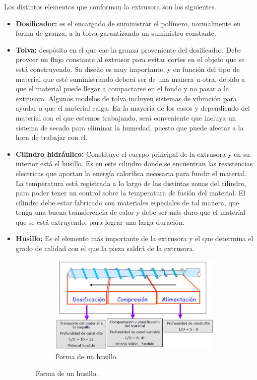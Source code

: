 Los distintos elementos que conforman la extrusora son los siguientes.
\begin{itemize}
    \item \textbf{Dosificador:} es el encargado de suministrar el polímero, normalmente en forma de granza, a la tolva garantizando un suministro constante.
    \item \textbf{Tolva:} despósito en el que cae la granza proveniente del dosificador. Debe proveer un flujo constante al extrusor para evitar cortes en el objeto que se está construyendo. Su diseño es muy importante, y en función del tipo de material que esté suministrando deberá ser de una manera u otra, debido a que el material puede llegar a compactarse en el fondo y no pasar a la extrusora. Algunos modelos de tolva incluyen sistemas de vibración para ayudar a que el material caiga. En la mayoría de los casos y dependiendo del material con el que estemos trabajando, será conveniente que incluya un sistema de secado para eliminar la humedad, puesto que puede afectar a la hora de trabajar con el.
    \item \textbf{Cilindro hidráulico:} Constituye el cuerpo principal de la extrusora y en su interior está el husillo. Es en este cilindro donde se encuentran las resistencias electricas que aportan la energía calorífica necesaria para fundir el material. La temperatura está registrada a lo largo de las distintas zonas del cilindro, para poder tener un control sobre la temperatura de fusión del material. El cilindro debe estar fabricado con materiales especiales de tal manera, que tenga una buena transferencia de calor y debe ser más duro que el materíal que se está extruyendo, para lograr una larga duración.
    \item \textbf{Husillo:} Es el elemento más importante de la extrusora y el que determina el grado de calidad con el que la pieza saldrá de la extrusora.\\
            \begin{figure}[H]
                      \centering
                        \begin{subfigure}[b]{0.55\textwidth}
                                \centering
                            \includegraphics[width=\textwidth]{images/husillo.jpg}
                            \caption{Forma de un husillo.}
                            \label{fig:estado_husillo1}
                        \end{subfigure}
                        

\end{figure}
\end{itemize}
